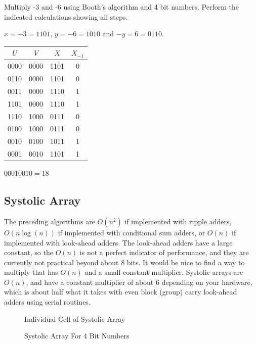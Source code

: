 \begin{example}
Multiply -3 and -6 using Booth's algorithm and 4 bit numbers.  Perform the indicated calculations showing all steps.

    {\color{ans}

    $x=-3=1101$, $y=-6=1010$ and $-y=6=0110$.

    \begin{tabular}{|c|c|c|c|}
      \hline
      $U$ & $V$ & $X$ & $X_{-1}$ \\ \hline
      0000 & 0000 & 1101 & 0 \\ \hline
      0110 & 0000 & 1101 & 0 \\
      0011 & 0000 & 1110 & 1 \\ \hline
      1101 & 0000 & 1110 & 1 \\
      1110 & 1000 & 0111 & 0 \\ \hline
      0100 & 1000 & 0111 & 0 \\
      0010 & 0100 & 1011 & 1 \\ \hline
      0001 & 0010 & 1101 & 1 \\ \hline
    \end{tabular}

    $00010010=18$
    }
\end{example}

\subsection{Systolic Array}

The preceding algorithms are $O(n^2)$ if implemented with ripple adders, $O(n\log(n))$ if implemented with conditional sum adders, or $O(n)$ if implemented with look-ahead adders.  The look-ahead adders have a large constant, so the $O(n)$ is not a perfect indicator of performance, and they are currently not practical beyond about 8 bits.  It would be nice to find a way to multiply that has $O(n)$ and a small constant multiplier.  Systolic arrays are $O(n)$, and have a constant multiplier of about 6 depending on your hardware, which is about half what it takes with even block (group) carry look-ahead adders using serial routines.

\begin{figure}[p]
  \SystolicCell
  \caption{Individual Cell of Systolic Array}\label{fig-systolic-cell}
\end{figure}

\begin{figure}[p]
  \SystolicArray
  \caption{Systolic Array For 4 Bit Numbers}\label{fig-systolic-array}
\end{figure}


